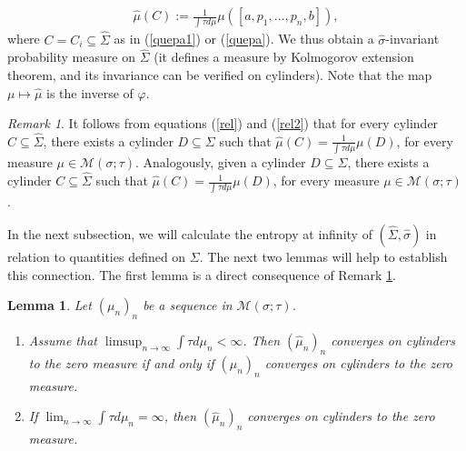 \documentclass[letterpaper,11pt]{amsart}
\theoremstyle{plain}
\theoremstyle{plain}
\newtheorem{lemma}[proposition]{Lemma}
\theoremstyle{definition}
\theoremstyle{remark}
\newtheorem{remark}{Remark}[section]
\def\M{{\mathcal M}}
\begin{document}
\begin{align*}\widehat{\mu}(C):=\frac{1}{\int {\tau} d\mu}\mu([a,p_1,\ldots ,p_n,b]),\end{align*}
 where $C=C_i\subseteq \widehat{\Sigma}$ as in  (\ref{quepa1}) or  (\ref{quepa}). We thus obtain a $\widehat{\sigma}$-invariant probability measure on $\widehat{\Sigma}$ (it defines a measure by Kolmogorov extension theorem, and its invariance can be verified on cylinders). Note that the map $\mu\mapsto\widehat{\mu}$ is the inverse of $\varphi$. 

\begin{remark}\label{rem:cyl} It follows from equations (\ref{rel}) and (\ref{rel2}) that for every cylinder $C\subseteq \widehat{\Sigma}$, there exists a cylinder $D\subseteq\Sigma$ such that $\widehat{\mu}(C)=\frac{1}{\int \tau d \mu}\mu(D)$, for every measure $\mu\in \M(\sigma;\tau)$. Analogously, given a cylinder $D\subseteq \Sigma$, there exists a cylinder $C\subseteq \widehat{\Sigma}$ such that $\widehat{\mu}(C)=\frac{1}{\int \tau d \mu}\mu(D)$, for every measure $\mu\in \M(\sigma;\tau)$.
\end{remark}

In the next subsection, we will calculate the entropy at infinity of $(\widehat{\Sigma}, \widehat{\sigma})$ in relation to quantities defined on $\Sigma$. The next two lemmas will help to establish this connection. The first lemma is a direct consequence of Remark \ref{rem:cyl}.

\begin{lemma}\label{tozero} Let $(\mu_n)_n$ be a sequence in $\M(\sigma;\tau)$. 
\begin{enumerate} 
\item\label{pi} Assume that $\limsup_{n\to\infty}\int \tau d\mu_n<\infty$. Then $(\widehat{\mu}_n)_n$ converges on cylinders to the zero measure if and only if $(\mu_{n})_n$ converges on cylinders to the zero measure.
\item\label{pii} If  $\lim_{n\to\infty}\int {\tau} d\mu_{n}=\infty$, then $(\widehat{\mu}_n)_n$ converges on cylinders to the zero measure.
\end{enumerate}
\end{lemma}
\end{document}
